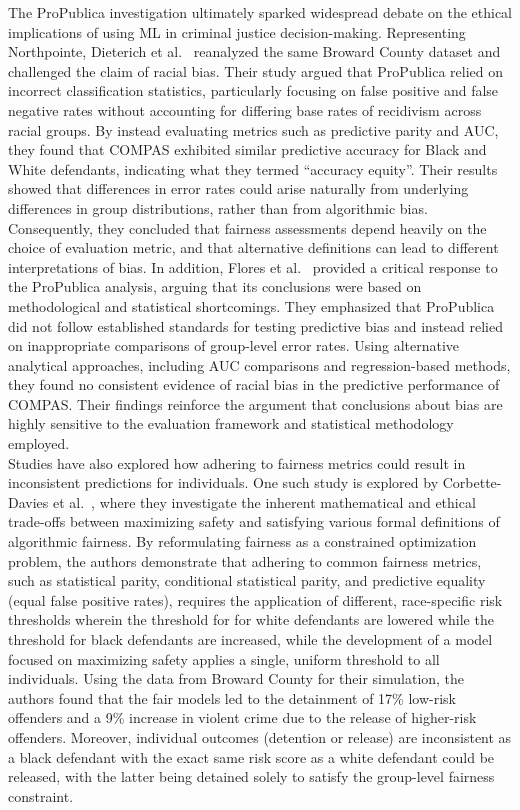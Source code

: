 \documentclass[12pt]{article}
\begin{document}
The ProPublica investigation ultimately sparked widespread debate on the ethical implications of using ML in criminal justice decision-making. Representing Northpointe, Dieterich et al.~\cite{dieterich2016compas} reanalyzed the same Broward County dataset and challenged the claim of racial bias. Their study argued that ProPublica relied on incorrect classification statistics, particularly focusing on false positive and false negative rates without accounting for differing base rates of recidivism across racial groups. By instead evaluating metrics such as predictive parity and AUC, they found that COMPAS exhibited similar predictive accuracy for Black and White defendants, indicating what they termed ``accuracy equity''. Their results showed that differences in error rates could arise naturally from underlying differences in group distributions, rather than from algorithmic bias. Consequently, they concluded that fairness assessments depend heavily on the choice of evaluation metric, and that alternative definitions can lead to different interpretations of bias. In addition, Flores et al.~\cite{flores2016false} provided a critical response to the ProPublica analysis, arguing that its conclusions were based on methodological and statistical shortcomings. They emphasized that ProPublica did not follow established standards for testing predictive bias and instead relied on inappropriate comparisons of group-level error rates. Using alternative analytical approaches, including AUC comparisons and regression-based methods, they found no consistent evidence of racial bias in the predictive performance of COMPAS. Their findings reinforce the argument that conclusions about bias are highly sensitive to the evaluation framework and statistical methodology employed.\\

Studies have also explored how adhering to fairness metrics could result in inconsistent predictions for individuals. One such study is explored by Corbette-Davies et al.~\cite{corbett2017algorithmic}, where they investigate the inherent mathematical and ethical trade-offs between maximizing safety and satisfying various formal definitions of algorithmic fairness. By reformulating fairness as a constrained optimization problem, the authors demonstrate that adhering to common fairness metrics, such as statistical parity, conditional statistical parity, and predictive equality (equal false positive rates), requires the application of different, race-specific risk thresholds wherein the threshold for  for white defendants are lowered while the threshold for black defendants are increased, while the development of a model focused on maximizing safety applies a single, uniform threshold to all individuals. Using the data from Broward County for their simulation, the authors found that the fair models led to the detainment of 17\% low-risk offenders and a 9\% increase in violent crime due to the release of higher-risk offenders. Moreover, individual outcomes (detention or release) are inconsistent as a black defendant with the exact same risk score as a white defendant could be released, with the latter being detained solely to satisfy the group-level fairness constraint. 
\end{document}
